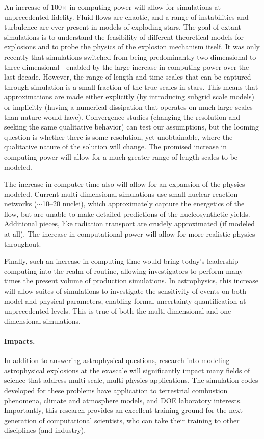 \documentclass[11pt,twocolumn]{article}
\begin{document}
An increase of 100$\times$ in computing power will allow for
simulations at unprecedented fidelity. Fluid flows are chaotic, and a
range of instabilities and turbulence are ever present in models of
exploding stars. The goal of extant simulations is to understand the
feasibility of different theoretical models for explosions and to
probe the physics of the explosion mechanism itself.  It was only
recently that simulations switched from being predominantly
two-dimensional to three-dimensional---enabled by the large increase
in computing power over the last decade.  However, the range of length
and time scales that can be captured through simulation is a small
fraction of the true scales in stars.  This means that approximations
are made either explicitly (by introducing subgrid scale
models) or implicitly (having a numerical dissipation that operates on
much large scales than nature would have).  Convergence studies
(changing the resolution and seeking the same qualitative behavior)
can test our assumptions, but the looming question is whether there is
some resolution, yet unobtainable, where the qualitative nature of the
solution will change.  The promised increase in computing power will
allow for a much greater range of length scales to be modeled.

The increase in computer time also will allow for an expansion of the
physics modeled.  Current multi-dimensional simulations use small
nuclear reaction networks ($\sim$10--20 nuclei), which approximately
capture the energetics of the flow, but are unable to make detailed
predictions of the nucleosynthetic yields.  Additional pieces, like
radiation transport are crudely approximated (if modeled at all).  The
increase in computational power will allow for more realistic physics
throughout.

Finally, such an increase in computing time would bring today's
leadership computing into the realm of routine, allowing investigators
to perform many times the present volume of production simulations.
In astrophysics, this increase will allow suites of simulations to
investigate the sensitivity of events on both model and physical
parameters, enabling formal uncertainty quantification at
unprecedented levels.  This is true of both the multi-dimensional and
one-dimensional simulations.

\paragraph*{Impacts.}
In addition to answering astrophysical questions, research into
modeling astrophysical explosions at the exascale will significantly
impact many fields of science that address multi-scale, multi-physics
applications.  The simulation codes developed for these problems have
application to terrestrial combustion phenomena, climate and
atmosphere models, and DOE laboratory interests.  Importantly, this
research provides an excellent training ground for the next generation
of computational scientists, who can take their training to other
disciplines (and industry).
\end{document}
